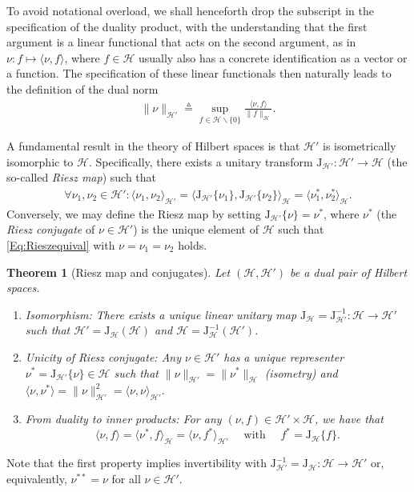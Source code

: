 \documentclass[11pt, english,english]{article}
\newtheorem{theorem}{Theorem}
\newcommand{\eqdef}{\stackrel{\vartriangle}{=}}
\def\Spc#1{{\mathcal{#1}}}  %
\def\Op#1{{\mathrm{#1}}}  %
\renewcommand{\[}{\begin{equation}}
\renewcommand{\]}[1]{\label{eq:#1}\end{equation}}
\begin{document}
To avoid notational overload, we shall henceforth drop the subscript in the specification of the duality product, with the understanding that the first argument is a linear functional that acts on the second argument, as in  $\nu: f \mapsto \langle \nu, f\rangle$, where $f \in \Spc H$ usually also has a concrete identification as a vector or a function. The specification of these linear functionals then naturally leads to the  definition of the 
dual norm
\begin{align}
\label{Eq:DualNorm}
\|\nu\|_{\Spc H'}\eqdef\sup_{f\in\Spc H\backslash\{0\}} 
\frac{\langle \nu,f\rangle}{\|f\|_{\Spc H}}. %
\end{align}

A fundamental result in the theory of Hilbert spaces is that $\Spc H'$ is isometrically isomorphic to $\Spc H$. Specifically, there exists a unitary transform $\Op J_{\Spc H'}: \Spc H' \to \Spc H$ (the so-called {\em Riesz map}) such that
\begin{align}
\forall \nu_1,\nu_2 \in \Spc H': \langle \nu_1, \nu_2\rangle_{\Spc H'}=\langle \Op J_{\Spc H'}\{\nu_1\},\Op J_{\Spc H'}\{\nu_2\}\rangle_{\Spc H}=\langle \nu^\ast_1, \nu^\ast_2\rangle_{\Spc H}.
\label{Eq:Rieszequival}
\end{align}
Conversely, we may define the Riesz map by setting $\Op J_{\Spc H'}\{\nu\}=\nu^\ast$, where $\nu^\ast$ (the {\em Riesz conjugate} of $\nu \in \Spc H'$) is the unique element of $\Spc H$ such that \eqref{Eq:Rieszequival} with $\nu=\nu_1=\nu_2$ holds.
\begin{theorem}[Riesz map and conjugates]
\label{Def:DualMap}
Let $(\Spc H,\Spc H')$ be a dual pair of Hilbert spaces.
\begin{enumerate}
\item Isomorphism: There exists a unique linear unitary map $\Op J_{\Spc H}=\Op J_{\Spc H'}^{-1}: \Spc H \to \Spc H'$ such that $\Spc H'=\Op J_{\Spc H}(\Spc H)$ and $\Spc H=\Op J^{-1}_{\Spc H}(\Spc H')$.
\item Unicity of Riesz conjugate: Any $\nu \in \Spc H'$ has a unique representer
$\nu^\ast=\Op J_{\Spc H'}\{\nu\} \in \Spc H$ such that $\|\nu\|_{\Spc H'}=\|\nu^\ast\|_{\Spc H}$ (isometry) and $\langle \nu,\nu^\ast \rangle=\|\nu\|^2_{\Spc H'}=\langle \nu,\nu \rangle_{\Spc H'}.$
\item From duality to inner products: For any $(\nu,f) \in \Spc H' \times \Spc H$, we have that %
$$\langle \nu,f \rangle= \langle \nu^\ast ,f \rangle_{\Spc H}=\langle \nu ,f^\ast \rangle_{\Spc H'}  \quad \mbox{ with }\quad f^\ast=\Op J_{\Spc H}\{f\}.$$
\end{enumerate}
\end{theorem}
Note that the first property implies invertibility with $\Op J_{\Spc H'}^{-1}=\Op J_{\Spc H}: \Spc H \to \Spc H'$ or, equivalently, $\nu^{\ast\ast}=\nu$  for all $\nu \in \Spc H'$.  
\end{document}
